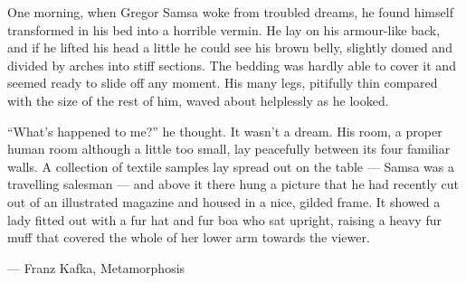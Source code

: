 \documentclass{article}
\begin{document}
  One morning, when Gregor Samsa woke from troubled dreams, he found himself
  transformed in his bed into a horrible vermin. He lay on his armour-like back,
  and if he lifted his head a little he could see his brown belly, slightly
  domed and divided by arches into stiff sections. The bedding was hardly able
  to cover it and seemed ready to slide off any moment. His many legs, pitifully
  thin compared with the size of the rest of him, waved about helplessly as he
  looked.

  ``What's happened to me?'' he thought. It wasn't a dream. His room, a proper
  human room although a little too small, lay peacefully between its four
  familiar walls. A collection of textile samples lay spread out on the table ---
  Samsa was a travelling salesman --- and above it there hung a picture that he
  had recently cut out of an illustrated magazine and housed in a nice, gilded
  frame. It showed a lady fitted out with a fur hat and fur boa who sat upright,
  raising a heavy fur muff that covered the whole of her lower arm towards the
  viewer.

  --- Franz Kafka, Metamorphosis
\end{document}
